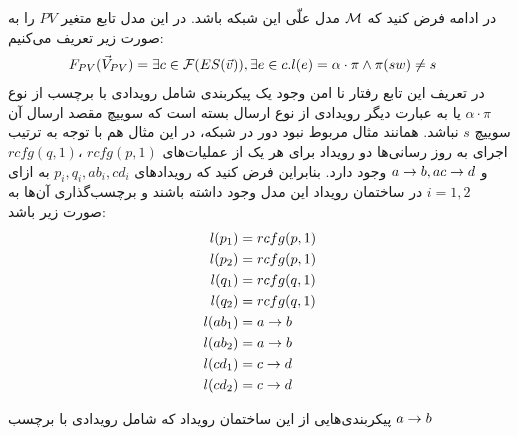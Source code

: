 در ادامه فرض کنید که 
$\mathcal{M}$
مدل علّی این شبکه باشد.
در این مدل تابع متغیر
$PV$
را به صورت زیر تعریف می‌کنیم:
\begin{align*}
    F_{PV}(\vec V_{PV}) & = \exists c \in \mathcal{F}(ES(\vec v)),
    \exists e \in c. l(e) =  \alpha\cdot\pi \wedge \pi(sw) \neq s
\end{align*}
در تعریف این تابع رفتار نا امن وجود یک پیکربندی شامل رویدادی با برچسب از نوع 
$\alpha \cdot \pi$
یا به عبارت دیگر رویدادی از نوع ارسال بسته است که سوییچ مقصد ارسال آن سوییچ 
$s$
نباشد.
همانند مثال مربوط نبود دور در شبکه، در این مثال هم با توجه به ترتیب اجرای به روز رسانی‌ها دو رویداد برای هر یک از عملیات‌های 
$rcfg(p,1)$
،$rcfg(q,1)$
و
$a\rightarrow b,a c\rightarrow d$
وجود دارد. 
بنابراین فرض کنید که رویدادهای
$p_i,q_i,ab_i,cd_i$
به ازای 
$i=1,2$
در ساختمان رویداد این مدل وجود داشته باشند و برچسب‌گذاری آن‌ها به صورت زیر باشد:
\begin{align*}
    l(p_1) & = rcfg(p,1) \\
    l(p_2) & = rcfg(p,1) \\
    l(q_1) & = rcfg(q,1) \\
    l(q_2) & = rcfg(q,1) \\
    l(ab_1) & = a \rightarrow b \\
    l(ab_2) & = a \rightarrow b \\
    l(cd_1) & = c \rightarrow d \\
    l(cd_2) & = c \rightarrow d \\
\end{align*}
\begin{figure}
    \centering
    \caption{}
    \label{fig:blackhole:es}
\end{figure}
پیکربندی‌هایی از این ساختمان رویداد که شامل رویدادی با برچسب 
$a \rightarrow b$
